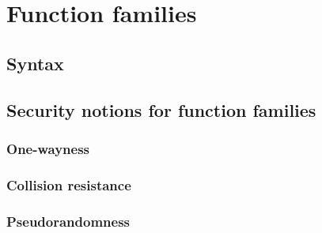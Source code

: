 \documentclass[../../main.tex]{subfiles}
\begin{document}
\onlyinsubfile
{
    
}

\section{Function families}\label{sec-ff}
    \subsection{Syntax}
        
    \subsection{Security notions for function families}
	    \subsubsection{One-wayness}
            
		\subsubsection{Collision resistance}
            
		\subsubsection{Pseudorandomness}
		    
		
\onlyinsubfile
{
    \begin{small}
        
        
    \end{small}
}
\end{document}
